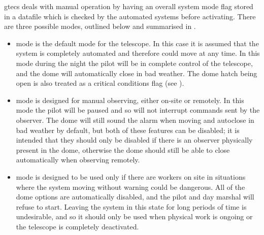 \begin{colsection}
\begin{colsection}
\gls{gtecs} deals with manual operation by having an overall system mode flag stored in a datafile which is checked by the automated systems before activating. There are three possible modes, outlined below and summarised in .

\begin{itemize}
    \item {} mode is the default mode for the telescope. In this case it is assumed that the system is completely automated and therefore could move at any time. In this mode during the night the pilot will be in complete control of the telescope, and the dome will automatically close in bad weather. The dome hatch being open is also treated as a critical conditions flag (see ).

    \item {} mode is designed for manual observing, either on-site or remotely. In this mode the pilot will be paused and so will not interrupt commands sent by the observer. The dome will still sound the alarm when moving and autoclose in bad weather by default, but both of these features can be disabled; it is intended that they should only be disabled if there is an observer physically present in the dome, otherwise the dome should still be able to close automatically when observing remotely.

    \item {} mode is designed to be used only if there are workers on site in situations where the system moving without warning could be dangerous. All of the dome options are automatically disabled, and the pilot and day marshal will refuse to start. Leaving the system in this state for long periods of time is undesirable, and so it should only be used when physical work is ongoing or the telescope is completely deactivated.
\end{itemize}

\end{colsection}


\end{colsection}


\newpage
